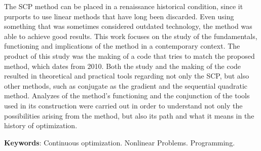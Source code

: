 
\begin{resumo}

  The SCP method can be placed in a renaissance historical condition, since it purports to use linear methods that have long been discarded. Even using something that was sometimes considered outdated technology, the method was able to achieve good results. This work focuses on the study of the fundamentals, functioning and implications of the method in a contemporary context. The product of this study was the making of a code that tries to match the proposed method, which dates from 2010. Both the study and the making of the code resulted in theoretical and practical tools regarding not only the SCP, but also other methods, such as conjugate as the gradient and the sequential quadratic method. Analyzes of the method's functioning and the conjunction of the tools used in its construction were carried out in order to understand not only the possibilities arising from the method, but also its path and what it means in the history of optimization. 

  \vspace{0.7cm}
  \textbf{Keywords}: Continuous optimization. Nonlinear Problems. Programming.

\end{resumo}

